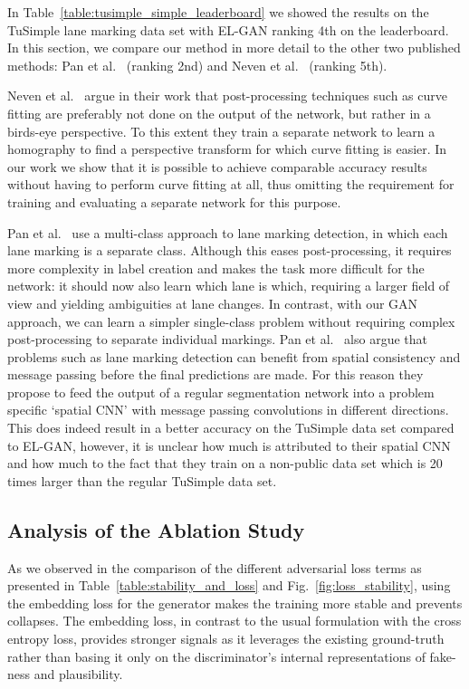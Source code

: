 \documentclass{article} \usepackage{nips13submit_e,times}
\newcommand{\elgan}{\mbox{EL-GAN}}
\begin{document}
In Table~\ref{table:tusimple_simple_leaderboard} we showed the results on the TuSimple lane marking data set with \elgan{} ranking 4th on the leaderboard.
In this section, we compare our method in more detail to the other two published methods: Pan et al.~\cite{pan2017spatial} (ranking 2nd) and Neven et al.~\cite{neven2018towards} (ranking 5th).

Neven et al.~\cite{neven2018towards} argue in their work that post-processing techniques such as curve fitting are preferably not done on the output of the network, but rather in a birds-eye perspective.
To this extent they train a separate network to learn a homography to find a perspective transform for which curve fitting is easier.
In our work we show that it is possible to achieve comparable accuracy results without having to perform curve fitting at all, thus omitting the requirement for training and evaluating a separate network for this purpose.

Pan et al.~\cite{pan2017spatial} use a multi-class approach to lane marking detection, in which each lane marking is a separate class.
Although this eases post-processing, it requires more complexity in label creation and makes the task more difficult for the network: it should now also learn which lane is which, requiring a larger field of view and yielding ambiguities at lane changes.
In contrast, with our GAN approach, we can learn a simpler single-class problem without requiring complex post-processing to separate individual markings.
Pan et al.~\cite{pan2017spatial} also argue that problems such as lane marking detection can benefit from spatial consistency and message passing before the final predictions are made.
For this reason they propose to feed the output of a regular segmentation network into a problem specific `spatial CNN' with message passing convolutions in different directions.
This does indeed result in a better accuracy on the TuSimple data set compared to \elgan{}, however, it is unclear how much is attributed to their spatial CNN and how much to the fact that they train on a non-public data set which is 20 times larger than the regular TuSimple data set.



\subsection{Analysis of the Ablation Study}

As we observed in the comparison of the different adversarial loss terms as presented in Table~\ref{table:stability_and_loss} and Fig.~\ref{fig:loss_stability}, using the embedding loss for the generator makes the training more stable and prevents collapses. 
The embedding loss, in contrast to the usual formulation with the cross entropy loss, provides stronger signals as it leverages the existing ground-truth rather than basing it only on the discriminator's internal representations of fake-ness and plausibility.
\end{document}

